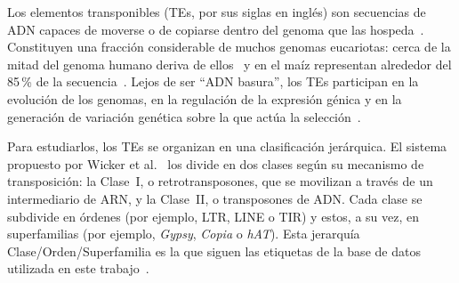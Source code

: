 
Los elementos transponibles (TEs, por sus siglas en inglés) son secuencias
de ADN capaces de moverse o de copiarse dentro del genoma que las
hospeda~\cite{bourque2018ten}. Constituyen una fracción considerable de
muchos genomas eucariotas: cerca de la mitad del genoma humano deriva de
ellos~\cite{lander2001initial} y en el maíz representan alrededor del
85\,\% de la secuencia~\cite{schnable2009b73}. Lejos de ser ``ADN
basura'', los TEs participan en la evolución de los genomas, en la
regulación de la expresión génica y en la generación de variación
genética sobre la que actúa la selección~\cite{bourque2018ten}.

Para estudiarlos, los TEs se organizan en una clasificación jerárquica.
El sistema propuesto por Wicker et al.~\cite{wicker2007unified} los
divide en dos clases según su mecanismo de transposición: la Clase~I,
o retrotransposones, que se movilizan a través de un intermediario de
ARN, y la Clase~II, o transposones de ADN. Cada clase se subdivide en
órdenes (por ejemplo, LTR, LINE o TIR) y estos, a su vez, en
superfamilias (por ejemplo, \textit{Gypsy}, \textit{Copia} o
\textit{hAT}). Esta jerarquía Clase/Orden/Superfamilia es la que siguen
las etiquetas de la base de datos utilizada en este
trabajo~\cite{orozcoarias2026panteon}.

